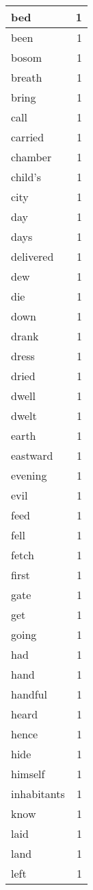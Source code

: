 \begin{center}
\begin{longtable}{l|r}
bed & 1 \\ \hline
been & 1 \\ \hline
bosom & 1 \\ \hline
breath & 1 \\ \hline
bring & 1 \\ \hline
call & 1 \\ \hline
carried & 1 \\ \hline
chamber & 1 \\ \hline
child's & 1 \\ \hline
city & 1 \\ \hline
day & 1 \\ \hline
days & 1 \\ \hline
delivered & 1 \\ \hline
dew & 1 \\ \hline
die & 1 \\ \hline
down & 1 \\ \hline
drank & 1 \\ \hline
dress & 1 \\ \hline
dried & 1 \\ \hline
dwell & 1 \\ \hline
dwelt & 1 \\ \hline
earth & 1 \\ \hline
eastward & 1 \\ \hline
evening & 1 \\ \hline
evil & 1 \\ \hline
feed & 1 \\ \hline
fell & 1 \\ \hline
fetch & 1 \\ \hline
first & 1 \\ \hline
gate & 1 \\ \hline
get & 1 \\ \hline
going & 1 \\ \hline
had & 1 \\ \hline
hand & 1 \\ \hline
handful & 1 \\ \hline
heard & 1 \\ \hline
hence & 1 \\ \hline
hide & 1 \\ \hline
himself & 1 \\ \hline
inhabitants & 1 \\ \hline
know & 1 \\ \hline
laid & 1 \\ \hline
land & 1 \\ \hline
left & 1 \\ \hline

\end{longtable}
\end{center}
